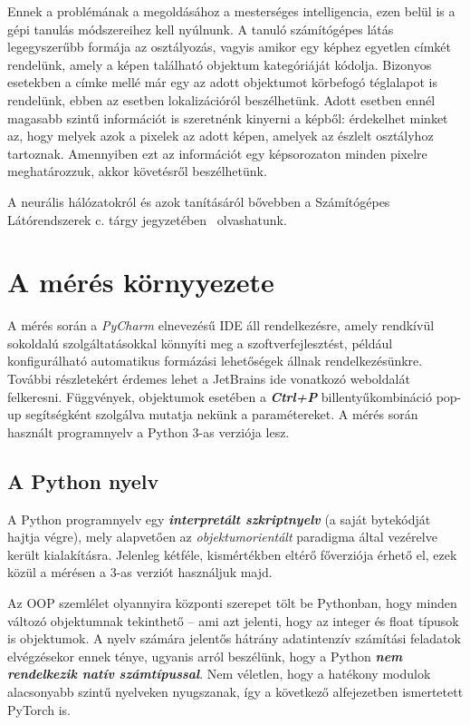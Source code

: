 \documentclass[12pt,a4paper,oneside]{report}             %
\begin{document}
Ennek a problémának a megoldásához a mesterséges intelligencia, ezen belül is a gépi tanulás módszereihez kell nyúlnunk. A tanuló számítógépes látás legegyszerűbb formája az osztályozás, vagyis amikor egy képhez egyetlen címkét rendelünk, amely a képen található objektum kategóriáját kódolja. Bizonyos esetekben a címke mellé már egy az adott objektumot körbefogó téglalapot is rendelünk, ebben az esetben lokalizációról beszélhetünk. Adott esetben ennél magasabb szintű információt is szeretnénk kinyerni a képből: érdekelhet minket az, hogy melyek azok a pixelek az adott képen, amelyek az észlelt osztályhoz tartoznak. Amennyiben ezt az információt egy képsorozaton minden pixelre meghatározzuk, akkor követésről beszélhetünk.

A neurális hálózatokról és azok tanításáról bővebben a Számítógépes Látórendszerek c. tárgy jegyzetében~\cite{szgl} olvashatunk.

\chapter{A mérés környyezete}

A mérés során a \emph{PyCharm} elnevezésű IDE áll rendelkezésre, amely rendkívül sokoldalú szolgáltatásokkal könnyíti meg a szoftverfejlesztést, például konfigurálható automatikus formázási lehetőségek állnak rendelkezésünkre. További részletekért érdemes lehet a JetBrains ide vonatkozó weboldalát~\cite{pycharm} felkeresni. Függvények, objektumok esetében a \textbf{\textit{Ctrl+P}} billentyűkombináció pop-up segítségként szolgálva mutatja nekünk a paramétereket. A mérés során használt programnyelv a Python 3-as verziója lesz.

\section{A Python nyelv}

A Python programnyelv egy \textbf{\textit{interpretált szkriptnyelv}} (a saját bytekódját hajtja végre), mely alapvetően az \emph{objektumorientált} paradigma által vezérelve került kialakításra. Jelenleg kétféle, kismértékben eltérő főverziója érhető el, ezek közül a mérésen a 3-as verziót használjuk majd.

Az OOP szemlélet olyannyira központi szerepet tölt be Pythonban, hogy minden változó objektumnak tekinthető – ami azt jelenti, hogy az integer és float típusok is objektumok. A nyelv számára jelentős hátrány adatintenzív számítási feladatok elvégzésekor ennek ténye, ugyanis arról beszélünk, hogy a Python \textbf{\textit{nem rendelkezik natív számtípussal}}. Nem véletlen, hogy a hatékony modulok alacsonyabb szintű nyelveken nyugszanak, így a következő alfejezetben ismertetett PyTorch is.
\end{document}
